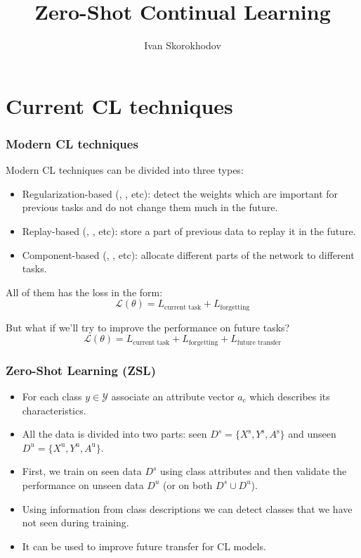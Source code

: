 \documentclass[10pt]{beamer}
\title{Zero-Shot Continual Learning}
\author{Ivan Skorokhodov}
\begin{document}
\begin{frame}
    \titlepage
\end{frame}

\section{Current CL techniques}
\begin{frame}
    \frametitle{Modern CL techniques}
    Modern CL techniques can be divided into three types:
    \begin{itemize}
        \item Regularization-based (\cite{EWC}, \cite{MAS}, etc): detect the weights which are important for previous tasks and do not change them much in the future.
        \item Replay-based (\cite{A-GEM}, \cite{MeRGAN}, etc): store a part of previous data to replay it in the future. 
        \item Component-based (\cite{HAT}, \cite{PathNet}, etc): allocate different parts of the network to different tasks.
    \end{itemize}
    
    All of them has the loss in the form:
    \[
    \mathcal{L(\theta)} = L_\text{current task} + L_\text{forgetting}
    \]
    
    But what if we'll try to improve the performance on future tasks?
    \[
    \mathcal{L(\theta)} = L_\text{current task} + L_\text{forgetting} + L_\text{future transfer}
    \]
\end{frame}

\begin{frame}
    \frametitle{Zero-Shot Learning (ZSL)}
    
    \begin{itemize}
        \item For each class $y \in \mathcal{Y}$ associate an attribute vector $a_c$ which describes its characteristics.
        \item All the data is divided into two parts: seen $D^s = \{X^{\text{s}}, Y^{\text{s}}, A^\text{s}\}$ and unseen $D^u = \{X^{\text{u}}, Y^{\text{u}}, A^\text{u}\}$.
        \item First, we train on seen data $D^s$ using class attributes and then validate the performance on unseen data $D^u$ (or on both $D^s \cup D^u$).
        \item Using information from class descriptions we can detect classes that we have not seen during training.
        \item It can be used to improve future transfer for CL models.
    \end{itemize}
\end{frame}
\end{document}
